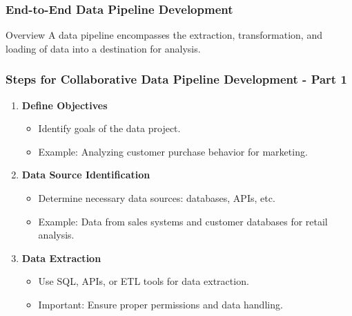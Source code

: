 \documentclass{beamer}
\begin{document}
\begin{frame}[fragile]
    \frametitle{End-to-End Data Pipeline Development}
    \begin{block}{Overview}
        A data pipeline encompasses the extraction, transformation, and loading of data into a destination for analysis.
    \end{block}
\end{frame}

\begin{frame}[fragile]
    \frametitle{Steps for Collaborative Data Pipeline Development - Part 1}
    \begin{enumerate}
        \item \textbf{Define Objectives}
        \begin{itemize}
            \item Identify goals of the data project.
            \item Example: Analyzing customer purchase behavior for marketing.
        \end{itemize}
        
        \item \textbf{Data Source Identification}
        \begin{itemize}
            \item Determine necessary data sources: databases, APIs, etc.
            \item Example: Data from sales systems and customer databases for retail analysis.
        \end{itemize}

        \item \textbf{Data Extraction}
        \begin{itemize}
            \item Use SQL, APIs, or ETL tools for data extraction.
            \item Important: Ensure proper permissions and data handling.
        \end{itemize}
    \end{enumerate}
\end{frame}
\end{document}
